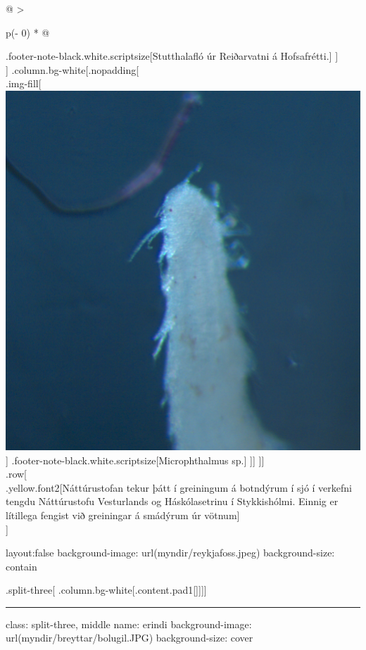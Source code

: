 \documentclass[
]{article}
\begin{document}
\begin{longtable}[]{@{}
  >{\raggedright\arraybackslash}p{(\columnwidth - 0\tabcolsep) * }@{}}
.footer-note-black.white.scriptsize{[}Stutthalafló úr Reiðarvatni á
Hofsafrétti.{]} {]} \\
{]} .column.bg-white{[}.nopadding{[} \\
.img-fill{[}\includegraphics{myndir/Clongocirrata.jpg}{]}
.footer-note-black.white.scriptsize{[}Microphthalmus sp.{]} {]}{]}
{]}{]} \\
.row{[} \\
.yellow.font2{[}Náttúrustofan tekur þátt í greiningum á botndýrum í sjó
í verkefni tengdu Náttúrustofu Vesturlands og Háskólasetrinu í
Stykkishólmi. Einnig er lítillega fengist við greiningar á smádýrum úr
vötnum{]} \\
{]} \\
\bottomrule
\end{longtable}

layout:false background-image: url(myndir/reykjafoss.jpeg)
background-size: contain

.split-three{[} .column.bg-white{[}.content.pad1{[}{]}{]}{]}{]}

\begin{center}\rule{0.5\linewidth}{0.5pt}\end{center}

class: split-three, middle name: erindi background-image:
url(myndir/breyttar/bolugil.JPG) background-size: cover
\end{document}
